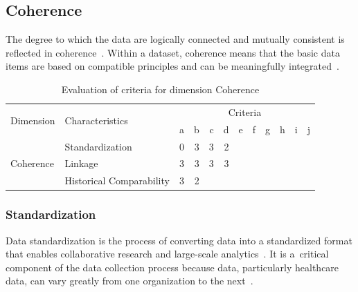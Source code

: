 \newpage
\subsection{Coherence}

The degree to which the data are logically connected and mutually consistent is reflected in coherence~\cite{oecd}.
Within a dataset, coherence means that the basic data items are based on compatible principles and can be meaningfully integrated~\cite{oecd}.

\begin{table}[htbp]
    \centering

    \begin{tabular}{llrrrrrrrrrr}
        \toprule
        \multirow{2}{*}{Dimension}  & \multirow{2}{*}{Characteristics}  & \multicolumn{10}{c}{Criteria}         \\ \cmidrule(lr){3-12}
                                    &                                   & a & b & c & d & e & f & g & h & i & j \\ \midrule
        \multirow{3}{*}{Coherence}  & Standardization                   & 0 & 3 & 3 & 2 &   &   &   &   &   &   \\
                                    & Linkage                           & 3 & 3 & 3 & 3 &   &   &   &   &   &   \\
                                    & Historical Comparability          & 3 & 2 &   &   &   &   &   &   &   &   \\
        \bottomrule
    \end{tabular}

    \caption{Evaluation of criteria for dimension Coherence}
    \label{table:coherence-benchmark}
\end{table}
\FloatBarrier

\subsubsection{Standardization}

Data standardization is the process of converting data into a standardized format that enables collaborative research and large-scale analytics~\cite{ohdsi-standardization}.
It is a~critical component of the data collection process because data, particularly healthcare data, can vary greatly from one organization to the next~\cite{ohdsi-standardization}.

